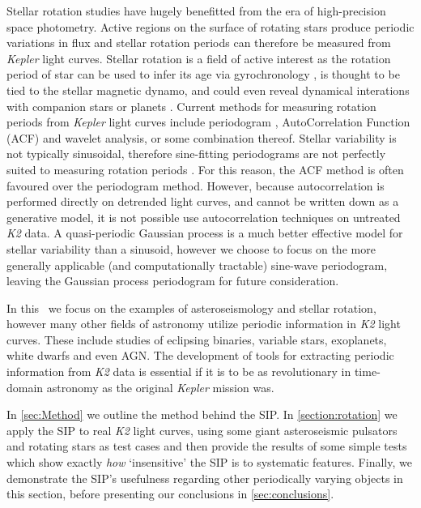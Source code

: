 Stellar rotation studies have hugely benefitted from the era of high-precision
space photometry.
Active regions on the surface of rotating stars produce periodic variations
in flux and stellar rotation periods can therefore be measured from
{\it Kepler} light curves.
Stellar rotation is a field of active interest as the rotation period of star
can be used to infer its age via gyrochronology
\citep{Skumanich1972, Barnes2007, Epstein2014, Angus2015}, is thought to be
tied to the stellar magnetic dynamo, and could even reveal dynamical
interations with companion stars or planets
\citep[e.g.][]{Beky2014, Poppenhaeger2014}.
Current methods for measuring rotation periods from {\it Kepler} light curves
include periodogram \citep[e.g.][]{Reinhold2013}, AutoCorrelation Function
(ACF) \citep{Mcquillan2013} and wavelet \citep[e.g.][]{Garcia2014} analysis,
or some combination thereof.
Stellar variability is not typically sinusoidal, therefore sine-fitting
periodograms are not perfectly suited to measuring rotation periods
\citep{Mcquillan2013}.
For this reason, the ACF method is often favoured over the periodogram method.
However, because autocorrelation is performed directly on detrended light
curves, and cannot be written down as a generative model, it is not possible
use autocorrelation techniques on untreated {\it K2} data.
A quasi-periodic Gaussian process is a much better effective model for stellar
variability than a sinusoid, however we choose to focus on the more generally
applicable (and computationally tractable) sine-wave periodogram, leaving the
Gaussian process periodogram for future consideration.

In this \article\ we focus on the examples of asteroseismology and stellar
rotation, however many other fields of astronomy utilize periodic information
in {\it K2} light curves.
These include studies of eclipsing binaries, variable stars, exoplanets, white
dwarfs and even AGN.
The development of tools for extracting periodic information from {\it K2}
data is essential if it is to be as revolutionary in time-domain
astronomy as the original {\it Kepler} mission was.

In \textsection\ref{sec:Method} we outline the method behind the SIP.
In \textsection\ref{section:rotation} we apply the SIP to real {\it K2} light
curves, using some giant asteroseismic pulsators and rotating stars as test
cases and then provide the results of some simple tests which show exactly
{\it how} `insensitive' the SIP is to systematic features.
Finally, we demonstrate the SIP's usefulness regarding other periodically
varying objects in this section, before presenting our conclusions in
\textsection\ref{sec:conclusions}.

